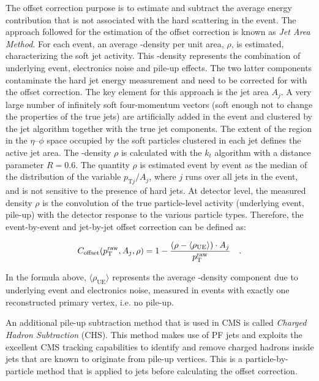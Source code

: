 The offset correction purpose is to estimate and subtract the average energy contribution that is not associated with the hard scattering in the event. The approach followed for the estimation of the offset correction is known as \emph{Jet Area Method}. For each event, an average \pt-density per unit area, $\rho$, is estimated, characterizing the soft jet activity. This \pt-density represents the combination of underlying event, electronics noise and pile-up effects. 
The two latter components contaminate the hard jet energy measurement and need to be
corrected for with the offset correction. The key element for this approach is the jet area $A_j$.
A very large number of infinitely soft four-momentum vectors (soft enough not to change the properties of the true jets) are artificially added in the event and clustered by the jet algorithm together with the true jet components. The extent of the region in the $\eta$--$\phi$ space occupied by the soft particles clustered in each jet defines the active jet area. The \pt-density $\rho$ is calculated with the $k_t$ algorithm with a distance parameter $R=0.6$. The quantity $\rho$ is estimated event by event as the median of the distribution of the variable $p_{\mathrm{T}j}/A_j$, where $j$ runs over all jets in the event, and is not sensitive to the presence of hard jets. At detector level, the measured density $\rho$ is the convolution of the true particle-level activity (underlying event, pile-up) with the detector response to the various particle types. Therefore, the event-by-event and jet-by-jet offset correction can be defined as:

\begin{equation}
C_\mathrm{offset}(p_\mathrm{T}^\mathrm{raw},A_j,\rho) = 1 - \frac{\left( \rho - \langle\rho_\mathrm{UE}\rangle \right)\cdot A_j}{p_\mathrm{T}^\mathrm{raw}}\quad .
\end{equation}

\noindent In the formula above, $\langle\rho_\mathrm{UE}\rangle$ represents the average \pt-density component due to underlying event and electronics noise, measured in events with exactly one reconstructed primary vertex, i.e. no pile-up.

An additional pile-up subtraction method that is used in CMS is called \emph{Charged Hadron Subtraction} (CHS). This method makes use of PF jets and exploits the excellent CMS tracking capabilities to identify and remove charged hadrons inside jets that are known to originate from pile-up vertices. This is a particle-by-particle method that is applied to jets before calculating the offset correction.

